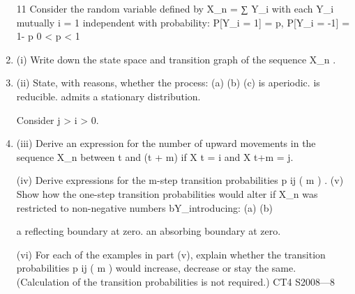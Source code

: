 \documentclass[a4paper,12pt]{article}
\begin{document}
\begin{enumerate}


11
Consider the random variable defined by X_n =
∑ Y_i with each Y_i mutually
i = 1
independent with probability:
P[Y_i = 1] = p, P[Y_i = -1] = 1- p
0 < p < 1
\item (i) Write down the state space and transition graph of the sequence X_n .
\item (ii) State, with reasons, whether the process:
(a)
(b)
(c)
is aperiodic.
is reducible.
admits a stationary distribution.


Consider j > i > 0.
\item (iii) Derive an expression for the number of upward movements in the sequence X_n
between t and (t + m) if X t = i and X t+m = j.

(iv) Derive expressions for the m-step transition probabilities p ij ( m ) .
(v) Show how the one-step transition probabilities would alter if X_n was restricted
to non-negative numbers bY_introducing:
(a)
(b)

a reflecting boundary at zero.
an absorbing boundary at zero.

(vi)
For each of the examples in part (v), explain whether the transition
probabilities p ij ( m ) would increase, decrease or stay the same.
(Calculation of the transition probabilities is not required.)
CT4 S2008—8


\end{enumerate}
\end{document}
